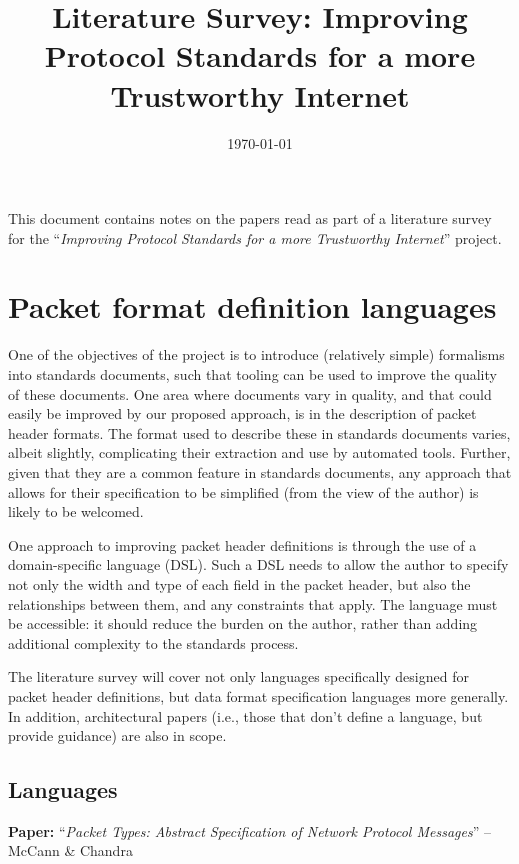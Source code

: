 \documentclass[10pt]{article}
\title{Literature Survey: Improving Protocol Standards for a more Trustworthy Internet}
\date{\today}
\newcommand{\paper}[3]{\vspace{4mm}\noindent\textbf{Paper:} ``\textit{#1}'' -- #2 \cite{#3}\vspace{3mm}}
\begin{document}
\maketitle

This document contains notes on the papers read as part of a literature survey for the
``\textit{Improving Protocol Standards for a more Trustworthy Internet}'' project.

\section{Packet format definition languages}

One of the objectives of the project is to introduce (relatively simple) formalisms into
standards documents, such that tooling can be used to improve the quality of these
documents. One area where documents vary in quality, and that could easily be
improved by our proposed approach, is in the description of packet header formats. The
format used to describe these in standards documents varies, albeit slightly, complicating
their extraction and use by automated tools. Further, given that they are a common feature
in standards documents, any approach that allows for their specification to be simplified
(from the view of the author) is likely to be welcomed.

One approach to improving packet header definitions is through the use of a
domain-specific language (DSL). Such a DSL needs to allow the author to specify not only
the width and type of each field in the packet header, but also the relationships between
them, and any constraints that apply. The language must be accessible: it should reduce
the burden on the author, rather than adding additional complexity to the standards 
process.

The literature survey will cover not only languages specifically designed for packet
header definitions, but data format specification languages more generally. In addition,
architectural papers (i.e., those that don't define a language, but provide guidance) are
also in scope.

\subsection{Languages}

\paper{Packet Types: Abstract Specification of Network Protocol Messages}{McCann \& Chandra}{mccann2000packet}
\end{document}
